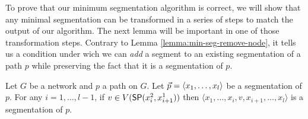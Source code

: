 % 

To prove that our minimum segmentation algorithm is correct, we will show that any minimal segmentation
can be transformed in a series of steps to match the output of our algorithm. The next lemma will be important
in one of those transformation steps. Contrary to Lemma \ref{lemma:min-seg-remove-node}, it tells us a condition under wich we can
\emph{add} a segment to an existing segmentation of a path $p$ while preserving the fact that it is a segmentation of $p$.

\begin{lemma}
\label{lemma:min-seg-add}
Let $G$ be a network and $p$ a path on $G$. Let $\sr{p} = \langle x_1, \ldots, x_l \rangle$ be a segmentation of $p$.
For any $i = 1, \ldots, l - 1$, if $v \in V(\sp(x^2_i, x^1_{i+1}))$ then $\langle x_1, \ldots, x_i, v, x_{i + 1}, \ldots, x_l \rangle$
is a segmentation of $p$.
\end{lemma}

